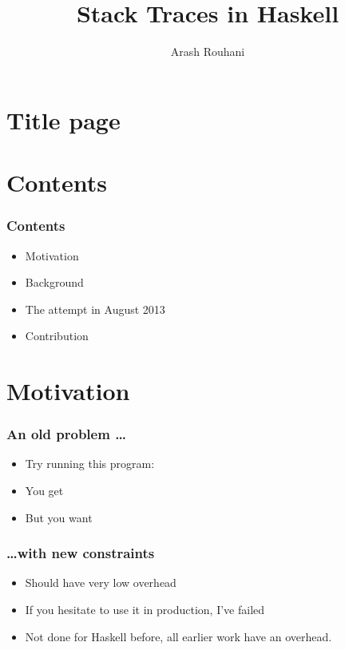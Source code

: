 \documentclass[11pt]{beamer} %
\title{Stack Traces in Haskell}
\author[Arash Rouhani]{Arash Rouhani} %
\institute{Chalmers University of Technology}
\begin{document}



\section{Title page} %
\begin{frame}[plain]
 \titlepage
\end{frame}

\section{Contents}
\begin{frame}
 \frametitle{Contents}
\begin{itemize}
 \item Motivation
 \item Background
 \item The attempt in August 2013
 \item Contribution
\end{itemize}
\end{frame}

\section{Motivation}

  \begin{frame}
   \frametitle{An old problem \dots}
  \begin{itemize}
   \item <1-> Try running this program:
     \motivationCode
   \item <2-> You get
     \outputNoTrace
   \item <3-> But you want
     \outputTrace
  \end{itemize}
  \end{frame}

  \begin{frame}
   \frametitle{\dots with new constraints}
  \begin{itemize}
   \item Should have very low overhead
   \item If you hesitate to use it in production, I've failed
   \item Not done for Haskell before, all earlier work have an overhead.
  \end{itemize}
  \end{frame}
\end{document}
